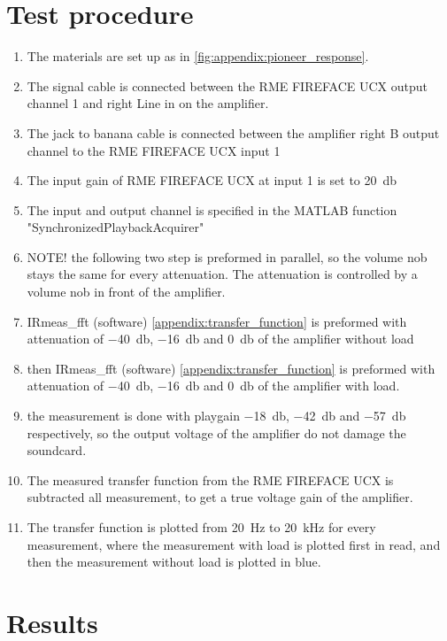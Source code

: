 \section*{Test procedure}


\begin{enumerate}
\item The materials are set up as in \autoref{fig:appendix:pioneer_response}.
\item The signal cable is connected between the RME FIREFACE UCX output channel 1 and right Line in on the amplifier.
\item The jack to banana cable is connected between the amplifier right B output channel to the  RME FIREFACE UCX input 1 
\item The input gain of RME FIREFACE UCX at input 1 is set to \SI{20}{\decibel}
\item The input and output channel is specified in the MATLAB function "SynchronizedPlaybackAcquirer" 
\item NOTE! the following two step is preformed in parallel, so the volume nob stays the same for every attenuation. The attenuation is controlled by a volume nob in front of the amplifier.
\item IRmeas_fft (software) \autoref{appendix:transfer_function} is preformed with attenuation of \SI{-40}{\decibel}, \SI{-16}{\decibel}  and  \SI{0}{\decibel} of the amplifier without load 
\item then IRmeas_fft (software) \autoref{appendix:transfer_function} is preformed with attenuation of \SI{-40}{\decibel}, \SI{-16}{\decibel} and \SI{0}{\decibel} of the amplifier with load. 
\item the measurement is done with playgain \SI{-18}{\decibel}, \SI{-42}{\decibel} and \SI{-57}{\decibel} respectively, so the output voltage of the amplifier do not damage the soundcard.
\item The measured transfer function from the RME FIREFACE UCX is subtracted all measurement, to get a true voltage gain of the amplifier.
\item The transfer function is plotted from \SI{20}{\hertz} to \SI{20}{\kilo\hertz} for every measurement, where the measurement with load is plotted first in read, and then the measurement without load is plotted in blue.

\end{enumerate}

\section*{Results}



